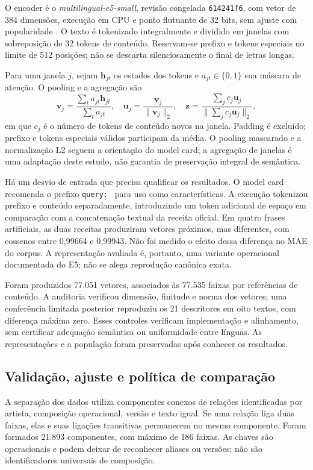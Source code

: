 O encoder é o \textit{multilingual-e5-small}, revisão congelada \texttt{614241f6}, com vetor de 384 dimensões, execução em CPU e ponto flutuante de 32 bits, sem ajuste com popularidade \cite{wang2024,e5card}. O texto é tokenizado integralmente e dividido em janelas com sobreposição de 32 tokens de conteúdo. Reservam-se prefixo e tokens especiais no limite de 512 posições; não se descarta silenciosamente o final de letras longas.

Para uma janela $j$, sejam $\bm h_{jt}$ os estados dos tokens e $a_{jt}\in\{0,1\}$ sua máscara de atenção. O pooling e a agregação são
\begin{equation}\label{eq:embedding}
 \bm v_j=\frac{\sum_t a_{jt}\bm h_{jt}}{\sum_t a_{jt}},\quad
 \bm u_j=\frac{\bm v_j}{\|\bm v_j\|_2},\quad
 \bm z=\frac{\sum_j c_j\bm u_j}{\|\sum_j c_j\bm u_j\|_2},
\end{equation}
em que $c_j$ é o número de tokens de conteúdo novos na janela. Padding é excluído; prefixo e tokens especiais válidos participam da média. O pooling mascarado e a normalização L2 seguem a orientação do model card; a agregação de janelas é uma adaptação deste estudo, não garantia de preservação integral de semântica.

Há um desvio de entrada que precisa qualificar os resultados. O model card recomenda o prefixo \texttt{query: } para uso como características. A execução tokenizou prefixo e conteúdo separadamente, introduzindo um token adicional de espaço em comparação com a concatenação textual da receita oficial. Em quatro frases artificiais, as duas receitas produziram vetores próximos, mas diferentes, com cossenos entre 0,99664 e 0,99943. Não foi medido o efeito dessa diferença no MAE do corpus. A representação avaliada é, portanto, uma variante operacional documentada do E5; não se alega reprodução canônica exata.

Foram produzidos 77.051 vetores, associados às 77.535 faixas por referências de conteúdo. A auditoria verificou dimensão, finitude e norma dos vetores; uma conferência limitada posterior reproduziu os 21 descritores em oito textos, com diferença máxima zero. Esses controles verificam implementação e alinhamento, sem certificar adequação semântica ou uniformidade entre línguas. As representações e a população foram preservadas após conhecer os resultados.

\subsection{Validação, ajuste e política de comparação}\label{subsec:validacao}
A separação dos dados utiliza componentes conexos de relações identificadas por artista, composição operacional, versão e texto igual. Se uma relação liga duas faixas, elas e suas ligações transitivas permanecem no mesmo componente. Foram formados 21.893 componentes, com máximo de 186 faixas. As chaves são operacionais e podem deixar de reconhecer aliases ou versões; não são identificadores universais de composição.

